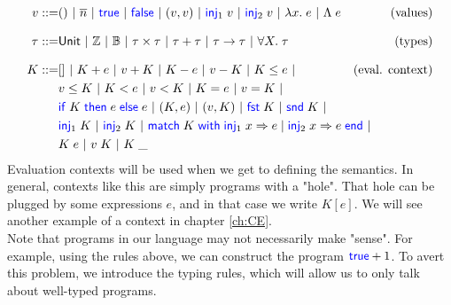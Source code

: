 \documentclass[a4paper, 11pt]{report}
\theoremstyle{definition}
\newcommand{\BNFdef}{::=}
\newcommand{\ALT}{~|~}
\newcommand{\Keyword}[1]{{\color{blue} \mathsf{#1}}}
\newcommand{\var}{x}
\newcommand{\expr}{e}
\newcommand{\val}{v}
\newcommand{\TT}{()}
\newcommand{\Num}[1]{\overline{#1}}
\newcommand{\True}{\Keyword{true}}
\newcommand{\False}{\Keyword{false}}
\newcommand{\IfCmd}{\Keyword{if}}
\newcommand{\ThenCmd}{\Keyword{then}}
\newcommand{\ElseCmd}{\Keyword{else}}
\def\If#1then#2else#3{\IfCmd{}\;#1\;\ThenCmd{}\;#2\;\ElseCmd{}\;#3}
\newcommand{\Fst}{\Keyword{fst}\;}
\newcommand{\Snd}{\Keyword{snd}\;}
\newcommand{\Inj}[1]{\Keyword{inj}_{#1}\;}
\newcommand{\MatchCmd}{\Keyword{match}}
\newcommand{\WithCmd}{\Keyword{with}}
\newcommand{\EndCmd}{\Keyword{end}}
\def\Match#1with#2=>#3|#4=>#5end{\MatchCmd{}\;#1\;\WithCmd{}\;#2\Rightarrow#3 \;|\;#4\Rightarrow#5\;\EndCmd{}}
\newcommand{\Tvar}{X}
\newcommand{\Tlam}{\Lambda\;}
\newcommand{\Tapp}[1]{#1\;\_}
\newcommand{\empelctx}{[]}
\newcommand{\elctx}{K}
\newcommand{\Tunit}{\mathsf{Unit}}
\newcommand{\Tint}{\mathbb{Z}}
\newcommand{\Tbool}{\mathbb{B}}
\newcommand{\Tprod}[2]{#1 \times #2}
\newcommand{\Tsum}[2]{#1 + #2}
\newcommand{\Tfunc}[2]{#1 \rightarrow #2}
\newcommand{\Tall}[2]{\forall #1.\; #2}
\newcommand{\typ}{\tau}
\begin{document}
\begin{align*}
  \val \BNFdef  & \TT \ALT \Num{n} \ALT \True \ALT \False \ALT
                  (\val, \val) \ALT \Inj{1} \val \ALT \Inj{2} \val \ALT
                  \fun \var . \expr \ALT \Tlam \expr
                  & \text{(values)}\\[8pt]
  \typ \BNFdef  & \Tunit \ALT \Tint \ALT \Tbool \ALT {\Tprod \typ \typ} \ALT
                  {\Tsum \typ \typ} \ALT {\Tfunc \typ \typ} \ALT 
                  {\Tall \Tvar \typ} & \text{(types)}\\[8pt]
  \elctx \BNFdef& \empelctx \ALT 
                  \elctx + \expr \ALT \val + \elctx \ALT
                  \elctx - \expr \ALT \val - \elctx \ALT
                  \elctx \le \expr \ALT
                  & \text{(eval. context)}\\
                & \val \le \elctx \ALT
                  \elctx < \expr \ALT \val < \elctx \ALT
                  \elctx = \expr \ALT \val = \elctx \ALT\\
                & {\If \elctx then \expr else \expr} \ALT
                  (\elctx, \expr) \ALT (\val, \elctx) \ALT
                  \Fst \elctx \ALT \Snd \elctx \ALT\\
                & \Inj{1} \elctx \ALT \Inj{2} \elctx \ALT
                  \Match \elctx with \Inj{1} \var => \expr | \Inj{2} \var => \expr end \ALT \span \\
                & \elctx \; \expr \ALT \val \; \elctx \ALT \Tapp{\elctx}
\end{align*}
Evaluation contexts will be used when we get to defining the semantics. In general, contexts like this are simply programs with a "hole". That hole can be plugged by some expressions $\expr$, and in that case we write $\elctx[\expr]$. We will see another example of a context in chapter \ref{ch:CE}.\\
Note that programs in our language may not necessarily make "sense". For example, using the rules above, we can construct the program $\True + 1$. To avert this problem, we introduce the typing rules, which will allow us to only talk about well-typed programs.
\end{document}
